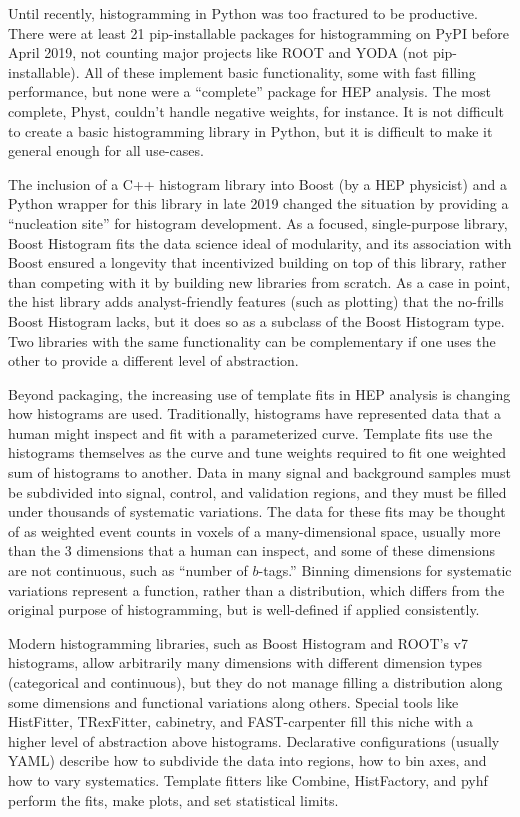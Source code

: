 \documentclass{article}
\begin{document}
Until recently, histogramming in Python was too fractured to be productive. There were at least 21 pip-installable packages for histogramming on PyPI before April 2019, not counting major projects like ROOT and YODA (not pip-installable). All of these implement basic functionality, some with fast filling performance, but none were a ``complete'' package for HEP analysis. The most complete, Physt, couldn't handle negative weights, for instance. It is not difficult to create a basic histogramming library in Python, but it is difficult to make it general enough for all use-cases.

The inclusion of a C++ histogram library into Boost (by a HEP physicist) and a Python wrapper for this library in late 2019 changed the situation by providing a ``nucleation site'' for histogram development. As a focused, single-purpose library, Boost Histogram fits the data science ideal of modularity, and its association with Boost ensured a longevity that incentivized building on top of this library, rather than competing with it by building new libraries from scratch. As a case in point, the hist library adds analyst-friendly features (such as plotting) that the no-frills Boost Histogram lacks, but it does so as a subclass of the Boost Histogram type. Two libraries with the same functionality can be complementary if one uses the other to provide a different level of abstraction.

Beyond packaging, the increasing use of template fits in HEP analysis is changing how histograms are used. Traditionally, histograms have represented data that a human might inspect and fit with a parameterized curve. Template fits use the histograms themselves as the curve and tune weights required to fit one weighted sum of histograms to another. Data in many signal and background samples must be subdivided into signal, control, and validation regions, and they must be filled under thousands of systematic variations. The data for these fits may be thought of as weighted event counts in voxels of a many-dimensional space, usually more than the 3 dimensions that a human can inspect, and some of these dimensions are not continuous, such as ``number of $b$-tags.'' Binning dimensions for systematic variations represent a function, rather than a distribution, which differs from the original purpose of histogramming, but is well-defined if applied consistently.

Modern histogramming libraries, such as Boost Histogram and ROOT's v7 histograms, allow arbitrarily many dimensions with different dimension types (categorical and continuous), but they do not manage filling a distribution along some dimensions and functional variations along others. Special tools like HistFitter, TRexFitter, cabinetry, and FAST-carpenter fill this niche with a higher level of abstraction above histograms. Declarative configurations (usually YAML) describe how to subdivide the data into regions, how to bin axes, and how to vary systematics. Template fitters like Combine, HistFactory, and pyhf perform the fits, make plots, and set statistical limits.
\end{document}
